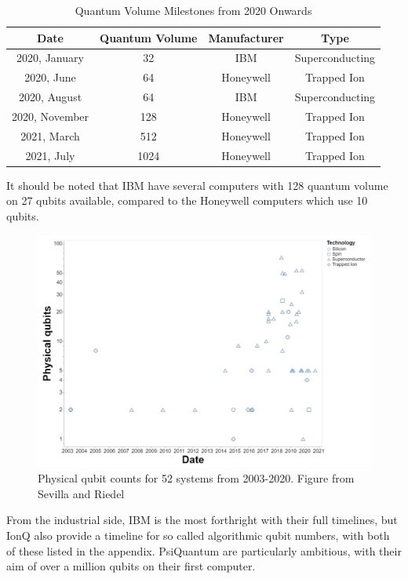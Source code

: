 \documentclass{article}
\theoremstyle{definition}
\begin{document}
\begin{table}[htb]
    \centering
    \begin{tabular}{cccc}
        Date & Quantum Volume & Manufacturer & Type  \\
        \hline
         2020, January & 32 & IBM & Superconducting \\
         2020, June & 64 & Honeywell & Trapped Ion \\
         2020, August & 64 & IBM & Superconducting \\
         2020, November & 128 & Honeywell & Trapped Ion \\
         2021, March & 512 & Honeywell & Trapped Ion \\
         2021, July & 1024 & Honeywell & Trapped Ion \\
    \end{tabular}
    \caption{Quantum Volume Milestones from 2020 Onwards}
    \label{tab:quantum_volume}
\end{table}

It should be noted that IBM have several computers with 128 quantum volume on 27 qubits available, compared to the Honeywell computers which use 10 qubits. 

\begin{figure}[htb]
    \centering
    \includegraphics[scale=0.4]{Physical qubit counts.jpg}
    \caption{Physical qubit counts for 52 systems from 2003-2020. Figure from Sevilla and Riedel \cite{sevilla2020forecasting}}
    \label{fig:my_label}
\end{figure}

From the industrial side, IBM is the most forthright with their full timelines, but IonQ also provide a timeline for so called algorithmic qubit numbers, with both of these listed in the appendix. PsiQuantum are particularly ambitious, with their aim of over a million qubits on their first computer. 
\end{document}
